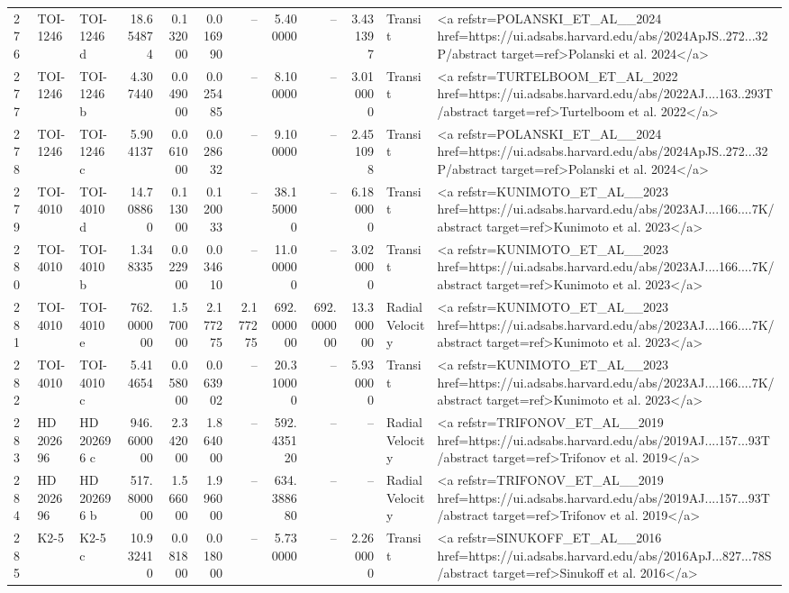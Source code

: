\begin{tabular}{lllrrrrrrrll}
276 & TOI-1246 & TOI-1246 d & 18.654874 & 0.132000 & 0.016990 & -- & 5.400000 & -- & 3.431397 & Transit & <a refstr=POLANSKI_ET_AL__2024 href=https://ui.adsabs.harvard.edu/abs/2024ApJS..272...32P/abstract target=ref>Polanski et al. 2024</a> \\
277 & TOI-1246 & TOI-1246 b & 4.307440 & 0.049000 & 0.025485 & -- & 8.100000 & -- & 3.010000 & Transit & <a refstr=TURTELBOOM_ET_AL_2022 href=https://ui.adsabs.harvard.edu/abs/2022AJ....163..293T/abstract target=ref>Turtelboom et al. 2022</a> \\
278 & TOI-1246 & TOI-1246 c & 5.904137 & 0.061000 & 0.028632 & -- & 9.100000 & -- & 2.451098 & Transit & <a refstr=POLANSKI_ET_AL__2024 href=https://ui.adsabs.harvard.edu/abs/2024ApJS..272...32P/abstract target=ref>Polanski et al. 2024</a> \\
279 & TOI-4010 & TOI-4010 d & 14.708860 & 0.113000 & 0.120033 & -- & 38.150000 & -- & 6.180000 & Transit & <a refstr=KUNIMOTO_ET_AL__2023 href=https://ui.adsabs.harvard.edu/abs/2023AJ....166....7K/abstract target=ref>Kunimoto et al. 2023</a> \\
280 & TOI-4010 & TOI-4010 b & 1.348335 & 0.022900 & 0.034610 & -- & 11.000000 & -- & 3.020000 & Transit & <a refstr=KUNIMOTO_ET_AL__2023 href=https://ui.adsabs.harvard.edu/abs/2023AJ....166....7K/abstract target=ref>Kunimoto et al. 2023</a> \\
281 & TOI-4010 & TOI-4010 e & 762.000000 & 1.570000 & 2.177275 & 2.177275 & 692.000000 & 692.000000 & 13.300000 & Radial Velocity & <a refstr=KUNIMOTO_ET_AL__2023 href=https://ui.adsabs.harvard.edu/abs/2023AJ....166....7K/abstract target=ref>Kunimoto et al. 2023</a> \\
282 & TOI-4010 & TOI-4010 c & 5.414654 & 0.058000 & 0.063902 & -- & 20.310000 & -- & 5.930000 & Transit & <a refstr=KUNIMOTO_ET_AL__2023 href=https://ui.adsabs.harvard.edu/abs/2023AJ....166....7K/abstract target=ref>Kunimoto et al. 2023</a> \\
283 & HD 202696 & HD 202696 c & 946.600000 & 2.342000 & 1.864000 & -- & 592.435120 & -- & -- & Radial Velocity & <a refstr=TRIFONOV_ET_AL__2019 href=https://ui.adsabs.harvard.edu/abs/2019AJ....157...93T/abstract target=ref>Trifonov et al. 2019</a> \\
284 & HD 202696 & HD 202696 b & 517.800000 & 1.566000 & 1.996000 & -- & 634.388680 & -- & -- & Radial Velocity & <a refstr=TRIFONOV_ET_AL__2019 href=https://ui.adsabs.harvard.edu/abs/2019AJ....157...93T/abstract target=ref>Trifonov et al. 2019</a> \\
285 & K2-5 & K2-5 c & 10.932410 & 0.081800 & 0.018000 & -- & 5.730000 & -- & 2.260000 & Transit & <a refstr=SINUKOFF_ET_AL__2016 href=https://ui.adsabs.harvard.edu/abs/2016ApJ...827...78S/abstract target=ref>Sinukoff et al. 2016</a> \\

\end{tabular}
